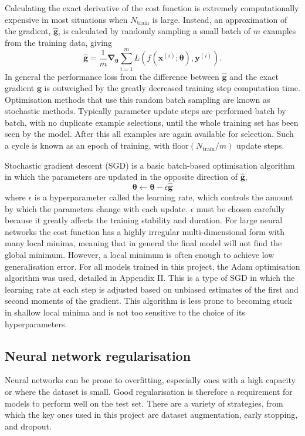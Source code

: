 \documentclass[12pt]{article}
\begin{document}
Calculating the exact derivative of the cost function is extremely computationally expensive in most situations when $N_{\mathrm{train}}$ is large. Instead, an approximation of the gradient, $\hat{\bm{g}}$, is calculated by randomly sampling a small batch of $m$ examples from the training data, giving
\begin{equation}
\hat{\bm{g}}=\frac{1}{m}\bm\nabla_{\bm\theta}\sum_{i=1}^mL(f(\bm{x}^{(i)};\boldsymbol\theta),\bm{y}^{(i)}).
\end{equation}
In general the performance loss from the difference between $\hat{\bm{g}}$ and the exact gradient $\bm{g}$ is outweighed by the greatly decreased training step computation time. Optimisation methods that use this random batch sampling are known as stochastic methods. Typically parameter update steps are performed batch by batch, with no duplicate example selections, until the whole training set has been seen by the model. After this all examples are again available for selection. Such a cycle is known as an epoch of training, with $\mathrm{floor}(N_{\mathrm{train}}/m)$ update steps.

Stochastic gradient descent (SGD) is a basic batch-based optimisation algorithm in which the parameters are updated in the opposite direction of $\hat{\bm{g}}$,
\begin{equation}
\bm\theta\leftarrow\bm\theta-\epsilon\hat{\bm{g}}
\end{equation}
where $\epsilon$ is a hyperparameter called the learning rate, which controls the amount by which the parameters change with each update. $\epsilon$ must be chosen carefully because it greatly affects the training stability and duration. For large neural networks the cost function has a highly irregular multi-dimensional form with many local minima, meaning that in general the final model will not find the global minimum. However, a local minimum is often enough to achieve low generalisation error. For all models trained in this project, the Adam optimisation algorithm was used, detailed in Appendix II. This is a type of SGD in which the learning rate at each step is adjusted based on unbiased estimates of the first and second moments of the gradient. This algorithm is less prone to becoming stuck in shallow local minima and is not too sensitive to the choice of its hyperparameters. 

\subsection{Neural network regularisation}
Neural networks can be prone to overfitting, especially ones with a high capacity or where the dataset is small. Good regularisation is therefore a requirement for models to perform well on the test set. There are a variety of strategies, from which the key ones used in this project are dataset augmentation, early stopping, and dropout.
\end{document}
